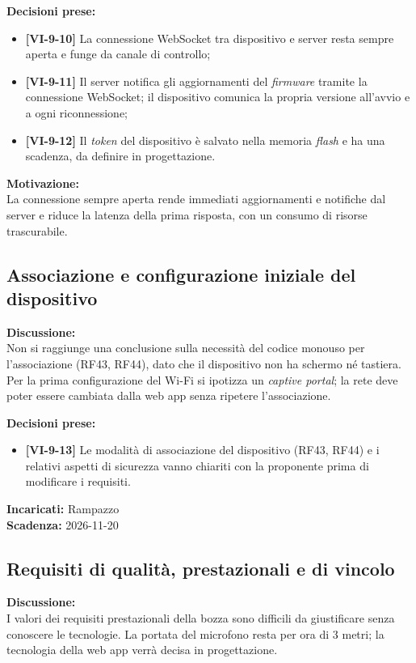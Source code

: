 \documentclass[12pt,a4paper]{article}
\newcommand{\vnum}{9}                     %
\newcommand{\tightlist}{\setlength{\itemsep}{1pt}\setlength{\parskip}{0pt}}
\begin{document}
\textbf{Decisioni prese:}
\begin{itemize}
\tightlist
\item[$\checkmark$] \textbf{[VI-\vnum-10]} La connessione WebSocket tra dispositivo e server resta sempre aperta e funge da canale di controllo;
\item[$\checkmark$] \textbf{[VI-\vnum-11]} Il server notifica gli aggiornamenti del \emph{firmware} tramite la connessione WebSocket; il dispositivo comunica la propria versione all'avvio e a ogni riconnessione;
\item[$\checkmark$] \textbf{[VI-\vnum-12]} Il \emph{token} del dispositivo è salvato nella memoria \emph{flash} e ha una scadenza, da definire in progettazione.
\end{itemize}

\textbf{Motivazione:}\\
La connessione sempre aperta rende immediati aggiornamenti e notifiche dal server e riduce la latenza della prima risposta, con un consumo di risorse trascurabile.

\hypertarget{odg-3}{%
\subsection{Associazione e configurazione iniziale del dispositivo}}
\textbf{Discussione:}\\
Non si raggiunge una conclusione sulla necessità del codice monouso per l'associazione (RF43, RF44), dato che il dispositivo non ha schermo né tastiera. Per la prima configurazione del Wi-Fi si ipotizza un \emph{captive portal}; la rete deve poter essere cambiata dalla web app senza ripetere l'associazione.

\textbf{Decisioni prese:}
\begin{itemize}
\tightlist
\item[$\checkmark$] \textbf{[VI-\vnum-13]} Le modalità di associazione del dispositivo (RF43, RF44) e i relativi aspetti di sicurezza vanno chiariti con la proponente prima di modificare i requisiti.
\end{itemize}

\textbf{Incaricati:} Rampazzo\\
\textbf{Scadenza:} 2026-11-20

\hypertarget{odg-4}{%
\subsection{Requisiti di qualità, prestazionali e di vincolo}}
\textbf{Discussione:}\\
I valori dei requisiti prestazionali della bozza sono difficili da giustificare senza conoscere le tecnologie. La portata del microfono resta per ora di 3 metri; la tecnologia della web app verrà decisa in progettazione.
\end{document}
